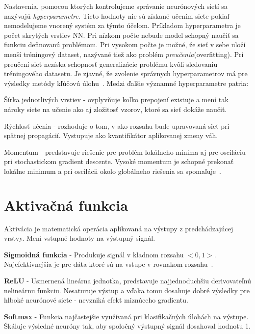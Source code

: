 Nastavenia, pomocou ktorých kontrolujeme správanie neurónových sietí sa nazývajú \textit{hyperparametre}. Tieto hodnoty nie sú získané učením siete pokiaľ nemodelujeme vnorený systém za týmto účelom. Príkladom hyperparametra je počet skrytých vrstiev NN. Pri nízkom počte nebude model schopný naučiť sa funkciu definovanú problémom. Pri vysokom počte je možné, že sieť v sebe uloží menší tréningový dataset, nazývané tiež ako problém \textit{preučenia}(overfitting). Pri preučení sieť nezíska schopnosť generalizácie problému kvôli sledovaniu tréningového datasetu. Je zjavné, že zvolenie správnych hyperparametrov má pre výsledky metódy kľúčovú úlohu~\cite{Goodfellow-et-al-2016-Book}.
 Medzi ďaľšie významné hyperparametre patria:
\begin{my_itemize}
	\item {Šírka jednotlivých vrstiev} - ovplyvňuje koľko prepojení existuje a mení tak nároky siete na učenie ako aj zložitosť vzorov, ktoré sa sieť dokáže naučiť.
	\item {Rýchlosť učenia} - rozhoduje o tom, v ako rozsahu bude upravovaná sieť pri spätnej propagácií. Vystupuje ako kvantifikátor aplikovanej zmeny váh.
	\item {Momentum} - predstavuje riešenie pre problém lokálneho minima aj pre osciláciu pri stochastickom gradient descente. Vysoké momentum je schopné prekonať lokálne minimum a pri oscilácii okolo globálneho riešenia sa spomaľuje~\cite{attoh1999analysis}.
\end{my_itemize}

\section{Aktivačná funkcia}
\label{activation_function}

Aktivácia je matematická operácia aplikovaná na výstupy z predchádzajúcej vrstvy. Mení vstupné hodnoty na výstupný signál. 

\textbf{Sigmoidná funkcia} - Produkuje signál v kladnom rozsahu $<0,1>$. Najefektívnejšia je pre dáta ktoré sú na vstupe v rovnakom rozsahu~\cite{sibi2013analysis}.

\textbf{ReLU} - Usmernená lineárna jednotka, predstavuje najjednoduchšiu derivovateľnú nelineárnu funkciu. Nesaturuje výstup a vďaka tomu dosahuje dobré výsledky pre hlboké neurónové siete - nevzniká efekt miznúceho gradientu.
	
\textbf{Softmax} - Funkcia najčastejšie využívaná pri klasifikačných úlohách na výstupe. Škáluje výsledné neuróny tak, aby spoločný výstupný signál dosahoval hodnotu 1. ~\cite{toth2013phone}


